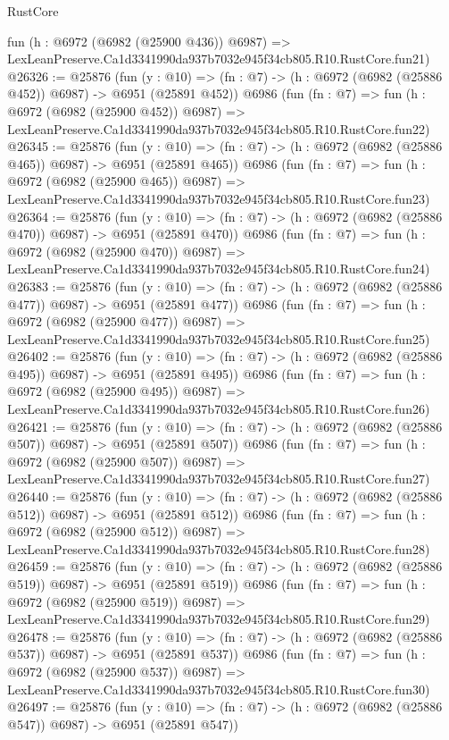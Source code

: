\begin{lexlean}{RustCore}
\begin{coremodule}
    fun (h : @6972 (@6982 (@25900 @436)) @6987) =>
    LexLeanPreserve.Ca1d3341990da937b7032e945f34cb805.R10.RustCore.fun21)
@26326 := @25876
    (fun (y : @10) => (fn : @7) -> (h : @6972 (@6982 (@25886 @452)) @6987) -> @6951 (@25891 @452))
    @6986
    (fun (fn : @7) =>
    fun (h : @6972 (@6982 (@25900 @452)) @6987) =>
    LexLeanPreserve.Ca1d3341990da937b7032e945f34cb805.R10.RustCore.fun22)
@26345 := @25876
    (fun (y : @10) => (fn : @7) -> (h : @6972 (@6982 (@25886 @465)) @6987) -> @6951 (@25891 @465))
    @6986
    (fun (fn : @7) =>
    fun (h : @6972 (@6982 (@25900 @465)) @6987) =>
    LexLeanPreserve.Ca1d3341990da937b7032e945f34cb805.R10.RustCore.fun23)
@26364 := @25876
    (fun (y : @10) => (fn : @7) -> (h : @6972 (@6982 (@25886 @470)) @6987) -> @6951 (@25891 @470))
    @6986
    (fun (fn : @7) =>
    fun (h : @6972 (@6982 (@25900 @470)) @6987) =>
    LexLeanPreserve.Ca1d3341990da937b7032e945f34cb805.R10.RustCore.fun24)
@26383 := @25876
    (fun (y : @10) => (fn : @7) -> (h : @6972 (@6982 (@25886 @477)) @6987) -> @6951 (@25891 @477))
    @6986
    (fun (fn : @7) =>
    fun (h : @6972 (@6982 (@25900 @477)) @6987) =>
    LexLeanPreserve.Ca1d3341990da937b7032e945f34cb805.R10.RustCore.fun25)
@26402 := @25876
    (fun (y : @10) => (fn : @7) -> (h : @6972 (@6982 (@25886 @495)) @6987) -> @6951 (@25891 @495))
    @6986
    (fun (fn : @7) =>
    fun (h : @6972 (@6982 (@25900 @495)) @6987) =>
    LexLeanPreserve.Ca1d3341990da937b7032e945f34cb805.R10.RustCore.fun26)
@26421 := @25876
    (fun (y : @10) => (fn : @7) -> (h : @6972 (@6982 (@25886 @507)) @6987) -> @6951 (@25891 @507))
    @6986
    (fun (fn : @7) =>
    fun (h : @6972 (@6982 (@25900 @507)) @6987) =>
    LexLeanPreserve.Ca1d3341990da937b7032e945f34cb805.R10.RustCore.fun27)
@26440 := @25876
    (fun (y : @10) => (fn : @7) -> (h : @6972 (@6982 (@25886 @512)) @6987) -> @6951 (@25891 @512))
    @6986
    (fun (fn : @7) =>
    fun (h : @6972 (@6982 (@25900 @512)) @6987) =>
    LexLeanPreserve.Ca1d3341990da937b7032e945f34cb805.R10.RustCore.fun28)
@26459 := @25876
    (fun (y : @10) => (fn : @7) -> (h : @6972 (@6982 (@25886 @519)) @6987) -> @6951 (@25891 @519))
    @6986
    (fun (fn : @7) =>
    fun (h : @6972 (@6982 (@25900 @519)) @6987) =>
    LexLeanPreserve.Ca1d3341990da937b7032e945f34cb805.R10.RustCore.fun29)
@26478 := @25876
    (fun (y : @10) => (fn : @7) -> (h : @6972 (@6982 (@25886 @537)) @6987) -> @6951 (@25891 @537))
    @6986
    (fun (fn : @7) =>
    fun (h : @6972 (@6982 (@25900 @537)) @6987) =>
    LexLeanPreserve.Ca1d3341990da937b7032e945f34cb805.R10.RustCore.fun30)
@26497 := @25876
    (fun (y : @10) => (fn : @7) -> (h : @6972 (@6982 (@25886 @547)) @6987) -> @6951 (@25891 @547))

\end{coremodule}
\end{lexlean}
